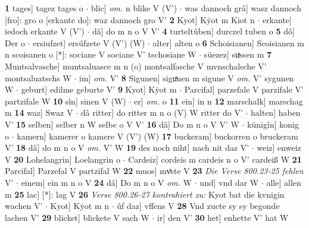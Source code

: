\documentclass[8pt,a4paper,notitlepage]{article}
\begin{document}
\begin{table}[ht]
\begin{minipage}[t]{0.5\linewidth}
\textbf{1} tages] tagez tages o  $\cdot$ blic] \textit{om.} n blike V (V')  $\cdot$ was dannoch grâ] wasz dannoch [fro]: gro o [erkante do]: waz dannoch gro V' \textbf{2} Kyot] Kẏot m Kiot n  $\cdot$ erkante] iedoch erkante V (V')  $\cdot$ dâ] do m n o V V' \textbf{4} turteltûben] durczel tuben o \textbf{5} dô] Der o  $\cdot$ ersiufzet] ersúfzete V (V') (W)  $\cdot$ alter] alten o \textbf{6} Schoisianen] Scoisianen m n scoisanen o [*]: sociane V sociane V' tschosiane W  $\cdot$ süezez] suͯssen m \textbf{7} Muntsalvasche] muntsaluasce m n (o) montsalfasche V mvnschalsche V' montsaluatschs W  $\cdot$ im] \textit{om.} V' \textbf{8} Sigunen] siguͯnen m sigune V \textit{om.} V' sygunen W  $\cdot$ geburt] edilme geburte V' \textbf{9} Kyot] Kẏot m  $\cdot$ Parcifal] parzefale V parzifale V' partzifale W \textbf{10} sîn] sinen V (W)  $\cdot$ er] \textit{om.} o \textbf{11} ein] in n \textbf{12} marschalk] marschag m \textbf{14} waz] Swaz V  $\cdot$ dâ ritter] do ritter m n o (V) W ritter do V'  $\cdot$ halten] haben V' \textbf{15} selben] selber n W selbe o V V' \textbf{16} dâ] Do m n o V V' W  $\cdot$ künigîn] konig o  $\cdot$ kamern] kamerer o kamere V (V') (W) \textbf{17} buckeram] buckorren o bruckeram V' \textbf{18} dâ] do m n o V \textit{om.} V' W \textbf{19} des noch niht] nach nit daz V'  $\cdot$ weiz] enweiz V \textbf{20} Lohelangrin] Loelangrin o  $\cdot$ Cardeiz] cordeis m cardeis n o V' cardeiß W \textbf{21} Parcifal] Parzefal V partzifal W \textbf{22} muos] mvͤste V \textbf{23} \textit{Die Verse 800.23-25 fehlen} V'   $\cdot$ einem] ein m n o V \textbf{24} dâ] Do m n o V \textit{om.} W  $\cdot$ und] vnd dar W  $\cdot$ alle] allen m \textbf{25} lac] [*]: lag V \textbf{26} \textit{Verse 800.26-27 kontrahiert zu:} Kyot bat die kvnigin wachen V'   $\cdot$ Kyot] Kẏot m n  $\cdot$ ûf daz] vffens V \textbf{28} Vnd zucte sy sy begonde lachen V' \textbf{29} blicket] blickete V sach W  $\cdot$ ir] den V' \textbf{30} het] enhette V' hat W \newline
\end{minipage}
\end{table}
\newpage
\end{document}
